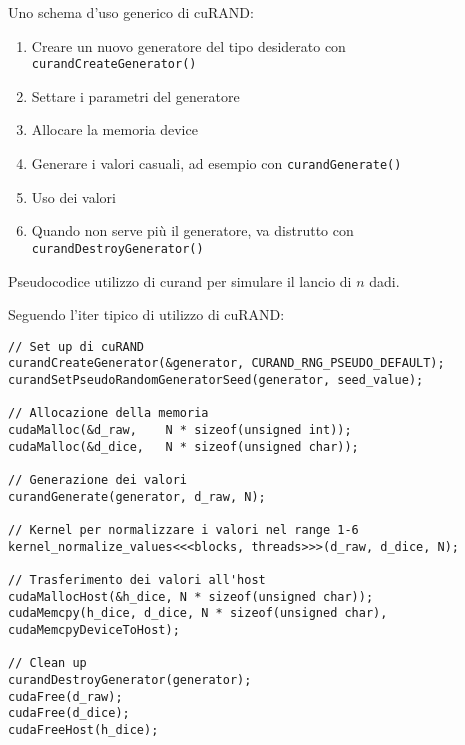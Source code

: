 \begin{questions}
\begin{solution}
        Uno schema d'uso generico di cuRAND:
        \begin{enumerate}
            \item Creare un nuovo generatore del tipo desiderato con \texttt{curandCreateGenerator()}
            
            \item Settare i parametri del generatore 
            
            \item Allocare la memoria device 
            
            \item Generare i valori casuali, ad esempio con \texttt{curandGenerate()}
            
            \item Uso dei valori 
            
            \item Quando non serve più il generatore, va distrutto con \texttt{curandDestroyGenerator()}
        \end{enumerate}
    \end{solution}
    
    \question Pseudocodice utilizzo di curand per simulare il lancio di $n$ dadi.
    
    \begin{solution}
        Seguendo l'iter tipico di utilizzo di cuRAND:
        \begin{verbatim}
// Set up di cuRAND
curandCreateGenerator(&generator, CURAND_RNG_PSEUDO_DEFAULT);
curandSetPseudoRandomGeneratorSeed(generator, seed_value);

// Allocazione della memoria
cudaMalloc(&d_raw,    N * sizeof(unsigned int));
cudaMalloc(&d_dice,   N * sizeof(unsigned char));

// Generazione dei valori
curandGenerate(generator, d_raw, N);

// Kernel per normalizzare i valori nel range 1-6
kernel_normalize_values<<<blocks, threads>>>(d_raw, d_dice, N);

// Trasferimento dei valori all'host
cudaMallocHost(&h_dice, N * sizeof(unsigned char));
cudaMemcpy(h_dice, d_dice, N * sizeof(unsigned char),
cudaMemcpyDeviceToHost);

// Clean up
curandDestroyGenerator(generator);
cudaFree(d_raw);
cudaFree(d_dice);
cudaFreeHost(h_dice);
        \end{verbatim}
    \end{solution}
\end{questions}